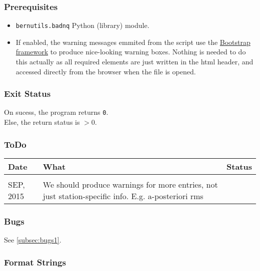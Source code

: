 \subsubsection{Prerequisites}
\begin{itemize}
\item \texttt{bernutils.badnq} Python (library) module.
\item If enabled, the warning messages emmited from the script use the 
\href{http://getbootstrap.com/2.3.2/index.html}{Bootstrap framework}
to produce nice-looking warning boxes. Nothing is needed to do this actually as all required
elements are just written in the html header, and accessed directly from the browser when
the file is opened.
\end{itemize}

\subsubsection{Exit Status}
On sucess, the program returns \texttt{0}.\\
Else, the return status is $>$0.

\subsubsection{ToDo}
\begin{tabular}{l l l}
Date & What & Status\\
\hline \\
SEP, 2015 & We should produce warnings for more entries, not just station-specific info. E.g. a-posteriori rms & \\
\end{tabular}

\subsubsection{Bugs}
See \autoref{subsec:bugs1}.

\subsubsection{Format Strings}

